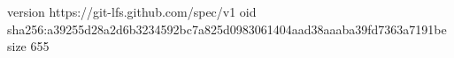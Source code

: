 version https://git-lfs.github.com/spec/v1
oid sha256:a39255d28a2d6b3234592bc7a825d0983061404aad38aaaba39fd7363a7191be
size 655
